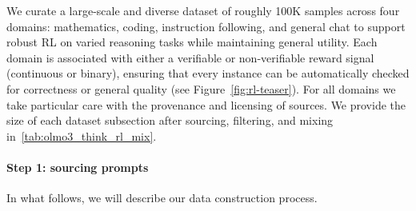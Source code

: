 \documentclass[table]{ai2style/ai2}
\begin{document}
We curate a large-scale and diverse dataset of roughly 100K samples across four domains: mathematics, coding, instruction following, and general chat to support robust RL on varied reasoning tasks while maintaining general utility.
Each domain is associated with either a verifiable or non-verifiable reward signal (continuous or binary), ensuring that every instance can be automatically checked for correctness or general quality (see Figure~\ref{fig:rl-teaser}).
For all domains we take particular care with the provenance and licensing of sources.
We provide the size of each dataset subsection after sourcing, filtering, and mixing in~\autoref{tab:olmo3_think_rl_mix}.

\paragraph{Step 1: sourcing prompts}

In what follows, we will describe our data construction process.
\end{document}
